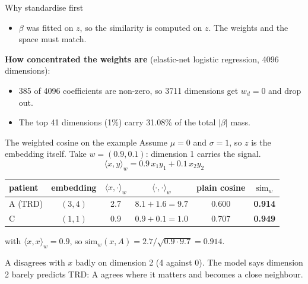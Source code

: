 \documentclass[aspectratio=169]{beamer}
\begin{document}
\begin{frame}{Why standardise first}
  \begin{itemize}
    \item $\beta$ was fitted on $z$, so the similarity is computed on $z$. The weights and the space must match.
  \end{itemize}
  \vspace{0.8em}
  \textbf{How concentrated the weights are} (elastic-net logistic regression, 4096 dimensions):
  \begin{itemize}
    \item 385 of 4096 coefficients are non-zero, so 3711 dimensions get $w_d=0$ and drop out.
    \item The top 41 dimensions (1\%) carry 31.08\% of the total $|\beta|$ mass.
  \end{itemize}
\end{frame}

\begin{frame}{The weighted cosine on the example}
  Assume $\mu=0$ and $\sigma=1$, so $z$ is the embedding itself. Take $w = (0.9, 0.1)$: dimension 1 carries the signal.
  \[
    \langle x,y\rangle_w = 0.9\,x_1y_1 + 0.1\,x_2y_2
  \]
  \begin{center}
  \begin{tabular}{lccccc}
    \toprule
    patient & embedding & $\langle x,\cdot\rangle_w$ & $\langle\cdot,\cdot\rangle_w$ & plain cosine & $\mathrm{sim}_w$ \\
    \midrule
    A (TRD) & $(3,4)$ & 2.7 & $8.1+1.6=9.7$ & 0.600 & \textbf{0.914} \\
    C & $(1,1)$ & 0.9 & $0.9+0.1=1.0$ & 0.707 & \textbf{0.949} \\
    \bottomrule
  \end{tabular}
  \end{center}
  with $\langle x,x\rangle_w = 0.9$, so $\mathrm{sim}_w(x,A) = 2.7/\sqrt{0.9\cdot 9.7} = 0.914$.

  \vspace{0.6em}
  A disagrees with $x$ badly on dimension 2 (4 against 0). The model says dimension 2 barely predicts TRD: A agrees where it matters and becomes a close neighbour.
\end{frame}
\end{document}
